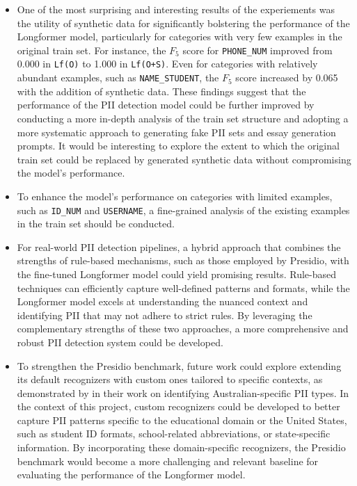 \documentclass[11pt]{article}
\begin{document}
\begin{itemize}

\item One of the most surprising and interesting results of the experiements was the utility of synthetic data for significantly bolstering the performance of the Longformer model, particularly for categories with very few examples in the original train set. For instance, the $F_5$ score for \texttt{PHONE\_NUM} improved from 0.000 in \texttt{Lf(O)} to 1.000 in \texttt{Lf(O+S)}. Even for categories with relatively abundant examples, such as \texttt{NAME\_STUDENT}, the $F_5$ score increased by 0.065 with the addition of synthetic data. These findings suggest that the performance of the PII detection model could be further improved by conducting a more in-depth analysis of the train set structure and adopting a more systematic approach to generating fake PII sets and essay generation prompts. It would be interesting to explore the extent to which the original train set could be replaced by generated synthetic data without compromising the model's performance.

\item To enhance the model's performance on categories with limited examples, such as \texttt{ID\_NUM} and \texttt{USERNAME}, a fine-grained analysis of the existing examples in the train set should be conducted.

\item For real-world PII detection pipelines, a hybrid approach that combines the strengths of rule-based mechanisms, such as those employed by Presidio, with the fine-tuned Longformer model could yield promising results. Rule-based techniques can efficiently capture well-defined patterns and formats, while the Longformer model excels at understanding the nuanced context and identifying PII that may not adhere to strict rules. By leveraging the complementary strengths of these two approaches, a more comprehensive and robust PII detection system could be developed. 

\item To strengthen the Presidio benchmark, future work could explore extending its default recognizers with custom ones tailored to specific contexts, as demonstrated by \citealt{AzizStraiton2023PIIDetection} in their work on identifying Australian-specific PII types. In the context of this project, custom recognizers could be developed to better capture PII patterns specific to the educational domain or the United States, such as student ID formats, school-related abbreviations, or state-specific information. By incorporating these domain-specific recognizers, the Presidio benchmark would become a more challenging and relevant baseline for evaluating the performance of the Longformer model.

\end{itemize}
\end{document}

